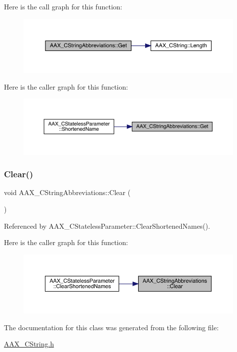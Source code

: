 Here is the call graph for this function\+:
\nopagebreak
\begin{figure}[H]
\begin{center}
\leavevmode
\includegraphics[width=350pt]{a01577_af21dca22bf79b4921f81432ba4e99223_cgraph}
\end{center}
\end{figure}
Here is the caller graph for this function\+:
\nopagebreak
\begin{figure}[H]
\begin{center}
\leavevmode
\includegraphics[width=350pt]{a01577_af21dca22bf79b4921f81432ba4e99223_icgraph}
\end{center}
\end{figure}
\mbox{\label{a01577_a6f909da041fa1bd21dfa28f1e384417e}} 
\subsubsection{\texorpdfstring{Clear()}{Clear()}}
{\footnotesize\ttfamily void A\+A\+X\+\_\+\+C\+String\+Abbreviations\+::\+Clear (\begin{DoxyParamCaption}{ }\end{DoxyParamCaption})\hspace{0.3cm}{\ttfamily [inline]}}



Referenced by A\+A\+X\+\_\+\+C\+Stateless\+Parameter\+::\+Clear\+Shortened\+Names().

Here is the caller graph for this function\+:
\nopagebreak
\begin{figure}[H]
\begin{center}
\leavevmode
\includegraphics[width=350pt]{a01577_a6f909da041fa1bd21dfa28f1e384417e_icgraph}
\end{center}
\end{figure}


The documentation for this class was generated from the following file\+:\begin{DoxyCompactItemize}
\item 
\mbox{\hyperlink{a00476}{A\+A\+X\+\_\+\+C\+String.\+h}}\end{DoxyCompactItemize}
